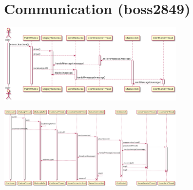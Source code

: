 \documentclass[11pt]{report}
\begin{document}
\section{Communication (boss2849)}
    \begin{minipage}{1\textwidth}
        \begin{center}
            \includegraphics[width=0.7\textwidth]{diagrams/sequence-chat-client}
        \end{center}
        \begin{center}
            \includegraphics[width=0.7\textwidth]{diagrams/sequence-chat-server}
        \end{center}
    \end{minipage}
    
\end{document}
